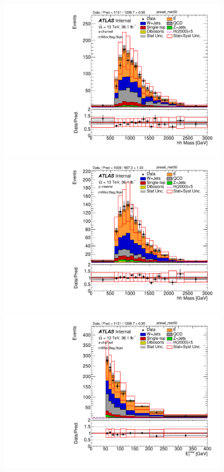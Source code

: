 \begin{figure}[!h]
\begin{center}
\includegraphics[scale=0.33]{./figures/boosted/PlotByChannels/DataMC_2tag_0bjet_mbbcr_elec_presel_met50_hhMassRebin1}                                                                               
\includegraphics[scale=0.33]{./figures/boosted/PlotByChannels/DataMC_2tag_0bjet_mbbcr_muon_presel_met50_hhMassRebin1}                                                                               
\includegraphics[scale=0.33]{./figures/boosted/PlotByChannels/DataMC_2tag_0bjet_mbbcr_elec_presel_met50_MET}                                                                                        

\end{center}
\end{figure}
